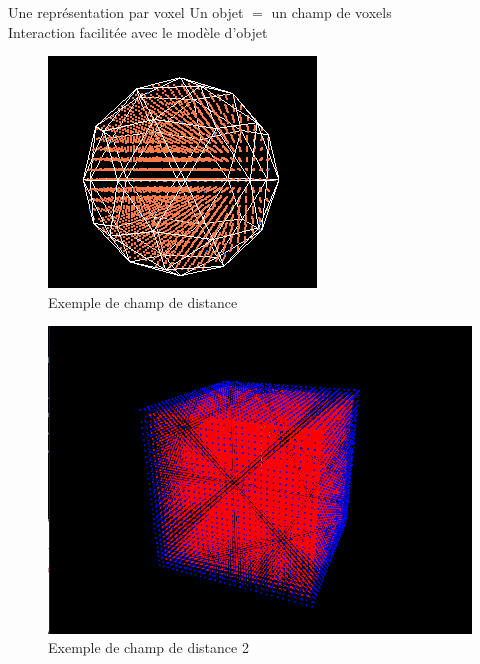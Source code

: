 \documentclass{beamer}
\begin{document}
\begin{frame}{Une représentation par voxel}
  Un objet $=$ un champ de voxels\\
  Interaction facilitée avec le modèle d'objet\\
  
  \begin{minipage}{0.48\linewidth} 
    \begin{figure}[!h]
    \centering\includegraphics[scale=0.4]{Distance.png}
    \caption{Exemple de champ de distance}
      \label{SansPerlin2}
    \end{figure}
  \end{minipage}
  \begin{minipage}{0.48\linewidth}
    \begin{figure}[!h]
    \centering\includegraphics[scale=0.2]{phi_inside.png}
    \caption{Exemple de champ de distance 2}
      \label{AvecPerlin222}
    \end{figure}
  \end{minipage}
\end{frame}
\end{document}
